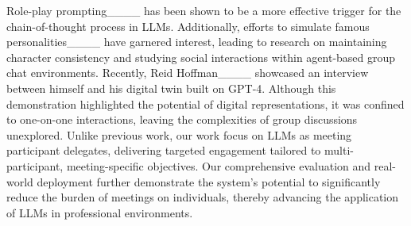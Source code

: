 
Role-play prompting____ has been shown to be a more effective trigger for the chain-of-thought process in LLMs. Additionally, efforts to simulate famous personalities____ have garnered interest, leading to research on maintaining character consistency and studying social interactions within agent-based group chat environments. Recently, Reid Hoffman____ showcased an interview between himself and his digital twin built on GPT-4. Although this demonstration highlighted the potential of digital representations, it was confined to one-on-one interactions, leaving the complexities of group discussions unexplored. Unlike previous work, our work focus on LLMs as meeting participant delegates, delivering targeted engagement tailored to multi-participant, meeting-specific objectives. Our comprehensive evaluation and real-world deployment further demonstrate the system's potential to significantly reduce the burden of meetings on individuals, thereby advancing the application of LLMs in professional environments.


%